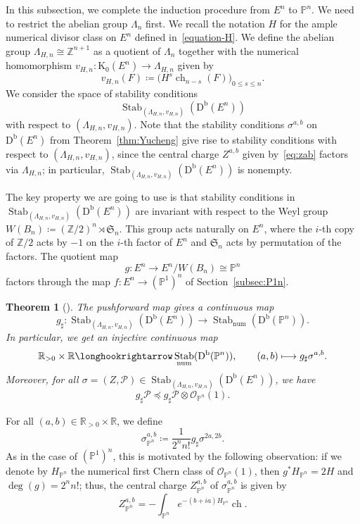 \documentclass[11pt, reqno]{amsart}
\numberwithin{equation}{section}
\theoremstyle{plain}
\newtheorem{theorem}{Theorem}[section]
\theoremstyle{remark}
\theoremstyle{definition}
\theoremstyle{italicsname}
\newcommand{\Db}{\mathrm{D^b}}
\DeclareMathOperator{\Stab}{Stab}
\DeclareMathOperator{\ch}{{ch}}
\newcommand{\cO}{\mathcal{O}}
\newcommand{\cP}{\mathscr{P}}
\newcommand{\rK}{\mathrm{K}}
\newcommand{\fS}{\mathfrak{S}}
\def\RR{\ensuremath{\mathbb{R}}}
\def\ZZ{\ensuremath{\mathbb{Z}}}
\def\PP{\ensuremath{\mathbb{P}}}
\begin{document}
In this subsection, we complete the induction procedure from $E^n$ to $\PP^n$.
We need to restrict the abelian group $\Lambda_n$ first.
We recall the notation $H$ for the ample numerical divisor class on $E^n$ defined in~\eqref{equation-H}.
We define the abelian group $\Lambda_{H,n}\cong\ZZ^{n+1}$ as a quotient of $\Lambda_n$ together with the numerical homomorphism $v_{H,n}\colon\rK_0(E^n)\to\Lambda_{H,n}$ given by
\[
v_{H,n}(F)\coloneqq\bigl(H^s\ch_{n-s}(F)\bigr)_{0\leq s\leq n}.
\]
We consider the space of stability conditions
\[
\Stab_{(\Lambda_{H,n},v_{H,n})}(\Db(E^n))
\]
with respect to $(\Lambda_{H,n},v_{H,n})$.
Note that the stability conditions $\sigma^{a,b}$ on $\Db(E^n)$ from Theorem~\ref{thm:Yucheng} give rise to stability conditions with respect to $(\Lambda_{H,n},v_{H,n})$, since the central charge $Z^{a,b}$ given by~\eqref{eq:zab} factors via $\Lambda_{H,n}$; in particular, $\Stab_{(\Lambda_{H,n},v_{H,n})}(\Db(E^n))$ is nonempty.

The key property we are going to use is that stability conditions in  $\Stab_{(\Lambda_{H,n},v_{H,n})}(\Db(E^n))$ are invariant with respect to the Weyl group $W(B_n)\coloneqq(\ZZ/2)^n\rtimes\fS_n$.
This group acts naturally on $E^n$, where the $i$-th copy of $\ZZ/2$ acts by $-1$ on the $i$-th factor of $E^n$ and $\fS_n$ acts by permutation of the factors. 
The quotient map 
\begin{equation*}
g\colon E^n\to E^n/W(B_n)\cong\PP^n 
\end{equation*}
factors through the map $f\colon E^n\to(\PP^1)^n$ of Section~\ref{subsec:P1n}.

\begin{theorem}[{\cite{chunyi-stability}}]\label{theorem-chunyi-Pn}
The pushforward map gives a continuous map
\[
g_\sharp\colon\Stab_{(\Lambda_{H,n},v_{H,n})}(\Db(E^n))\longrightarrow\Stab_\mathrm{num}(\Db(\PP^n)).
\]
In particular, we get an injective continuous map
\[
\RR_{>0}\times\RR\longhookrightarrow\Stab_{\mathrm{num}}(\Db(\PP^n)),\qquad (a,b)\longmapsto g_\sharp\sigma^{a,b}.
\]
Moreover, for all $\sigma=(Z,\cP)\in\Stab_{(\Lambda_{H,n},v_{H,n})}(\Db(E^n))$, we have
\begin{equation}\label{eq:BayerPropertyPn}
g_\sharp\cP\preceq g_\sharp\cP\otimes\cO_{\PP^n}(1).    
\end{equation}
\end{theorem}

For all $(a,b)\in\RR_{>0}\times\RR$, we define
\begin{equation}\label{eq:stabonPn}
\sigma^{a,b}_{\PP^n}\coloneqq \frac{1}{2^n n!} g_\sharp\sigma^{2a,2b}.    
\end{equation}
As in the case of $(\PP^1)^n$, this is motivated by the following observation: if we denote by $H_{\PP^n}$ the numerical first Chern class of $\cO_{\PP^n}(1)$, then $g^*H_{\PP^n}=2H$ and $\deg(g)=2^nn!$; thus, the central charge $Z^{a,b}_{\PP^n}$ of $\sigma^{a,b}_{\PP^n}$ is given by 
\begin{equation}\label{eq:ZstabonPn}
Z^{a,b}_{\PP^n}=-\int_{\PP^n} e^{-(b+ia)H_{\PP^n}}\ch.
\end{equation}
\end{document}
